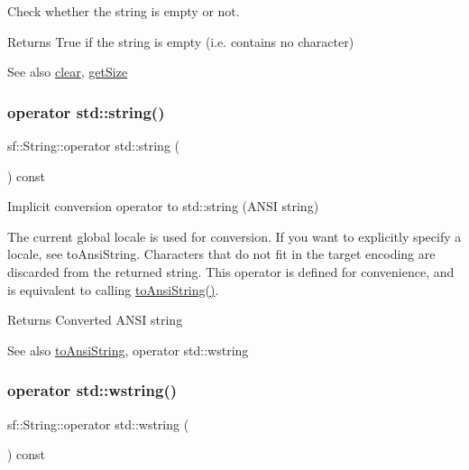 Check whether the string is empty or not. 

\begin{DoxyReturn}{Returns}
True if the string is empty (i.\+e. contains no character)
\end{DoxyReturn}
\begin{DoxySeeAlso}{See also}
\hyperlink{classsf_1_1_string_a391c1b4950cbf3d3f8040cea73af2969}{clear}, \hyperlink{classsf_1_1_string_ae7aff54e178f5d3e399953adff5cad20}{get\+Size} 
\end{DoxySeeAlso}
\mbox{\label{classsf_1_1_string_a884816a0f688cfd48f9324c9741dc257}} 
\subsubsection{\texorpdfstring{operator std\+::string()}{operator std::string()}}
{\footnotesize\ttfamily sf\+::\+String\+::operator std\+::string (\begin{DoxyParamCaption}{ }\end{DoxyParamCaption}) const}



Implicit conversion operator to std\+::string (A\+N\+SI string) 

The current global locale is used for conversion. If you want to explicitly specify a locale, see to\+Ansi\+String. Characters that do not fit in the target encoding are discarded from the returned string. This operator is defined for convenience, and is equivalent to calling \hyperlink{classsf_1_1_string_ada5d5bba4528aceb0a1e298553e6c30a}{to\+Ansi\+String()}.

\begin{DoxyReturn}{Returns}
Converted A\+N\+SI string
\end{DoxyReturn}
\begin{DoxySeeAlso}{See also}
\hyperlink{classsf_1_1_string_ada5d5bba4528aceb0a1e298553e6c30a}{to\+Ansi\+String}, operator std\+::wstring 
\end{DoxySeeAlso}
\mbox{\label{classsf_1_1_string_a6bd1444bebaca9bbf01ba203061f5076}} 
\subsubsection{\texorpdfstring{operator std\+::wstring()}{operator std::wstring()}}
{\footnotesize\ttfamily sf\+::\+String\+::operator std\+::wstring (\begin{DoxyParamCaption}{ }\end{DoxyParamCaption}) const}



